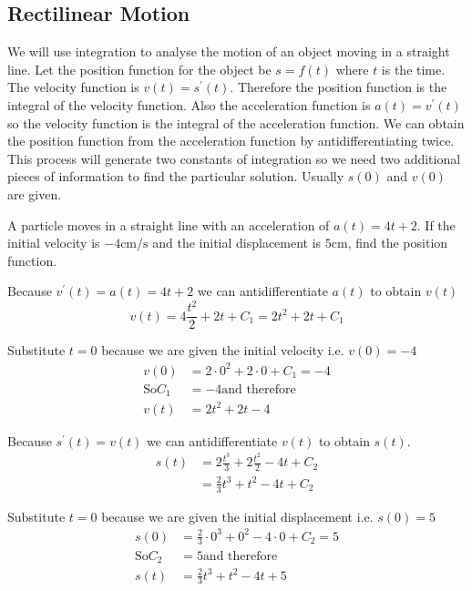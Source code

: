 \subsection*{Rectilinear Motion}
We will use integration to analyse the motion of an object moving in a straight line. Let
the position function for the object be $s =f (t)$ where $t$ is the time. The velocity function is $v (t) =s^{ \prime } (t)$. Therefore the position function is the integral of the velocity function. Also
the acceleration function is $a (t) =v^{ \prime } (t)$ so the velocity function is the integral of the acceleration function. We can obtain
the position function from the acceleration function by antidifferentiating twice. This process will generate
two constants of integration so we need two additional pieces of information to find the particular solution. Usually
$s (0)$ and $v (0)$ are given. 

\example A particle moves in a straight line with an acceleration of $a (t) =4 t +2$. If the initial velocity is $ -4 \mbox{cm}$/$\mbox{s}$ and the initial displacement is $5 \mbox{cm}$, find the position function. 

\solution Because $v^{ \prime } (t) =a (t) =4 t +2$ we can antidifferentiate $a (t)$ to obtain $v (t)$
\begin{equation*}v (t) =4 \frac{t^{2}}{2} +2 t +C_{1} =2 t^{2} +2 t +C_{1}
\end{equation*}

Substitute $t =0$ because we are given the initial velocity i.e. $v (0) = -4$
\begin{align*}v (0) &  = 2 \cdot 0^{2} +2 \cdot 0 +C_{1} = -4 \\
\text{So}C_{1} &  =  -4\text{and therefore} \\
v (t) &  = 2 t^{2} +2 t -4\end{align*}

Because $s^{ \prime } (t) =v (t)$ we can antidifferentiate $v (t)$ to obtain $s (t)$.
\begin{align*}s (t) &  = 2 \frac{t^{3}}{3} +2 \frac{t^{2}}{2} -4 t +C_{2} \\
 &  = \frac{2}{3} t^{3} +t^{2} -4 t +C_{2}\end{align*}

Substitute $t =0$ because we are given the initial displacement i.e. $s (0) =5$
\begin{align*}s (0) &  = \frac{2}{3} \cdot 0^{3} +0^{2} -4 \cdot 0 +C_{2} =5 \\
\text{So}C_{2} &  = 5\text{and therefore} \\
s (t) &  = \frac{2}{3} t^{3} +t^{2} -4 t +5\end{align*}

